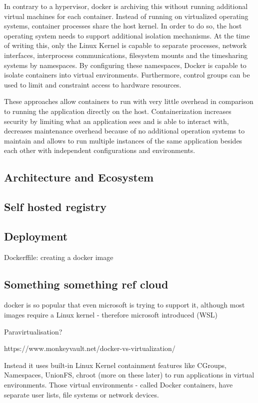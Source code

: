 In contrary to a hypervisor, docker is archiving this without running additional virtual machines for each container.
Instead of running on virtualized operating systems, container processes share the host kernel.
In order to do so, the host operating system needs to support additional isolation mechanisms.
At the time of writing this, only the Linux Kernel is capable to separate processes, network interfaces, interprocess communications, filesystem mounts and the timesharing systems by namespaces.
By configuring these namespaces, Docker is capable to isolate containers into virtual environments.
Furthermore, control groups can be used to limit and constraint access to hardware resources.
\cite{docker:overview}

These approaches allow containers to run with very little overhead in comparison to running the application directly on the host.
Containerization increases security by limiting what an application sees and is able to interact with, decreases maintenance overhead because of no additional operation systems to maintain and allows to run multiple instances of the same application besides each other with independent configurations and environments.

\subsection{Architecture and Ecosystem}
\label{docker:ecosystem}

\subsection{Self hosted registry}

\subsection{Deployment}

Dockerffile: creating a docker image

\subsection{Something something ref cloud }

docker is so popular that even microsoft is trying to support it, although most images require a Linux kernel - therefore microsoft introduced (WSL)

Paravirtualisation?

https://www.monkeyvault.net/docker-vs-virtualization/

Instead it uses built-in Linux Kernel containment features like CGroups, Namespaces, UnionFS, chroot (more on these later) to run applications in virtual environments. Those virtual environments - called Docker containers, have separate user lists, file systems or network devices.